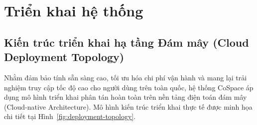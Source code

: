 \section{Triển khai hệ thống}

\subsection{Kiến trúc triển khai hạ tầng Đám mây (Cloud Deployment Topology)}

Nhằm đảm bảo tính sẵn sàng cao, tối ưu hóa chi phí vận hành và mang lại trải nghiệm truy cập tốc độ cao cho người dùng trên toàn quốc, hệ thống CoSpace áp dụng mô hình triển khai phân tán hoàn toàn trên nền tảng điện toán đám mây (Cloud-native Architecture). Mô hình kiến trúc triển khai thực tế được minh họa chi tiết tại Hình~\ref{fig:deployment-topology}.

